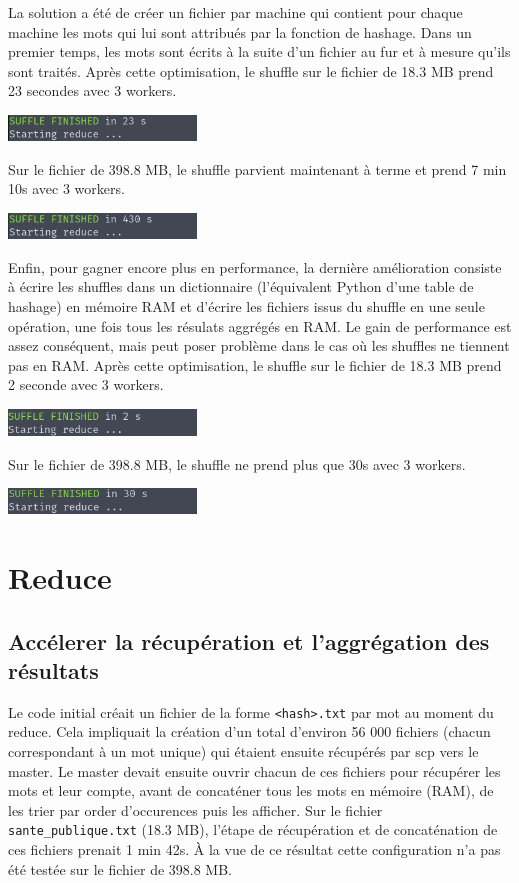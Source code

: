 \documentclass[11pt,a4paper]{article}
\begin{document}
La solution a été de créer un fichier par machine qui contient pour chaque machine les mots qui lui sont attribués par la fonction de hashage. Dans un premier temps, les mots sont écrits à la suite d'un fichier au fur et à mesure qu'ils sont traités. Après cette optimisation, le shuffle sur le fichier de 18.3 MB prend 23 secondes avec 3 workers.

\includegraphics[width=5cm]{screenshot_shuffle3.png}

Sur le fichier de 398.8 MB, le shuffle parvient maintenant à terme et prend 7 min 10s avec 3 workers.

\includegraphics[width=5cm]{screenshot_shuffle4.png}

Enfin, pour gagner encore plus en performance, la dernière amélioration consiste à écrire les shuffles dans un dictionnaire (l'équivalent Python d'une table de hashage) en mémoire RAM et d'écrire les fichiers issus du shuffle en une seule opération, une fois tous les résulats aggrégés en RAM. Le gain de performance est assez conséquent, mais peut poser problème dans le cas où les shuffles ne tiennent pas en RAM. Après cette optimisation, le shuffle sur le fichier de 18.3 MB prend 2 seconde avec 3 workers.

\includegraphics[width=5cm]{screenshot_shuffle5.png}

Sur le fichier de 398.8 MB, le shuffle ne prend plus que 30s avec 3 workers.

\includegraphics[width=5cm]{screenshot_shuffle6.png}


\section{Reduce}
\subsection*{Accélerer la récupération et l'aggrégation des résultats}
Le code initial créait un fichier de la forme \texttt{<hash>.txt} par mot au moment du reduce. Cela  impliquait la création d'un total d'environ 56 000 fichiers (chacun correspondant à un mot unique) qui étaient ensuite récupérés par scp vers le master. Le master devait ensuite ouvrir chacun de ces fichiers pour récupérer les mots et leur compte, avant de concaténer tous les mots en mémoire (RAM), de les trier par order d'occurences puis les afficher. Sur le fichier \texttt{sante\_publique.txt} (18.3 MB), l'étape de récupération et de concaténation de ces fichiers prenait 1 min 42s. À la vue de ce résultat cette configuration n'a pas été testée sur le fichier de 398.8 MB.
\end{document}
